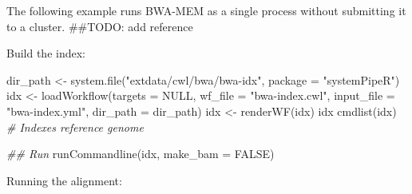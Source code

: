 \documentclass[14pt,]{article}
\newcommand{\hlstr}[1]{\textcolor[rgb]{0.251,0.627,0.251}{#1}}%
\newcommand{\hlcom}[1]{\textcolor[rgb]{0.502,0.502,0.502}{\textit{#1}}}%
\newcommand{\hlstd}[1]{\textcolor[rgb]{0.251,0.251,0.251}{#1}}%
\newcommand{\hlkwc}[1]{\textcolor[rgb]{0.251,0.251,0.251}{#1}}%
\newcommand{\hlkwd}[1]{\textcolor[rgb]{0.878,0.439,0.125}{#1}}%
\newenvironment{Shaded}{\begin{myshaded}}{\end{myshaded}}
\newcommand{\KeywordTok}[1]{\hlkwd{#1}}
\newcommand{\DataTypeTok}[1]{\hlkwc{#1}}
\newcommand{\StringTok}[1]{\hlstr{#1}}
\newcommand{\CommentTok}[1]{\hlcom{#1}}
\newcommand{\OtherTok}[1]{{#1}}
\newcommand{\NormalTok}[1]{\hlstd{#1}}
\begin{document}
The following example runs BWA-MEM as a single process without submitting it to a cluster. \#\#TODO: add reference

Build the index:

\begin{Shaded}
\begin{Highlighting}[]
\NormalTok{dir_path <-}\StringTok{ }\KeywordTok{system.file}\NormalTok{(}\StringTok{"extdata/cwl/bwa/bwa-idx"}\NormalTok{, }\DataTypeTok{package =} \StringTok{"systemPipeR"}\NormalTok{)}
\NormalTok{idx <-}\StringTok{ }\KeywordTok{loadWorkflow}\NormalTok{(}\DataTypeTok{targets =} \OtherTok{NULL}\NormalTok{, }\DataTypeTok{wf_file =} \StringTok{"bwa-index.cwl"}\NormalTok{, }\DataTypeTok{input_file =} \StringTok{"bwa-index.yml"}\NormalTok{, }
    \DataTypeTok{dir_path =}\NormalTok{ dir_path)}
\NormalTok{idx <-}\StringTok{ }\KeywordTok{renderWF}\NormalTok{(idx)}
\NormalTok{idx}
\KeywordTok{cmdlist}\NormalTok{(idx)  }\CommentTok{# Indexes reference genome}

\CommentTok{## Run}
\KeywordTok{runCommandline}\NormalTok{(idx, }\DataTypeTok{make_bam =} \OtherTok{FALSE}\NormalTok{)}
\end{Highlighting}
\end{Shaded}

Running the alignment:
\end{document}
